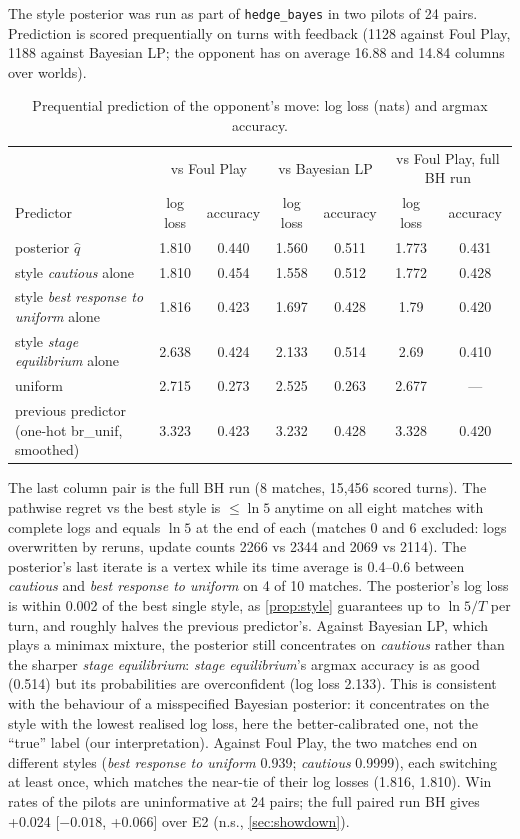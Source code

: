\documentclass[10pt]{article}
\theoremstyle{plain}
\theoremstyle{definition}
\theoremstyle{remark}
\newcommand{\qhat}{\hat q}
\begin{document}
The style posterior was run as part of \texttt{hedge\_bayes} in two pilots of 24 pairs. Prediction is scored
prequentially on turns with feedback (1128 against Foul Play, 1188 against Bayesian LP; the opponent has on average 16.88
and 14.84 columns over worlds).
\begin{table}[!htbp]\centering\small
\caption{Prequential prediction of the opponent's move: log loss (nats) and argmax accuracy.}\label{tab:behav}
\begin{tabular}{@{}lcccccc@{}}\toprule
 & \multicolumn{2}{c}{vs Foul Play} & \multicolumn{2}{c}{vs Bayesian LP} & \multicolumn{2}{c}{vs Foul Play, full BH run} \\
Predictor & log loss & accuracy & log loss & accuracy & log loss & accuracy \\ \midrule
posterior $\qhat$ & 1.810 & 0.440 & 1.560 & 0.511 & 1.773 & 0.431 \\
style \emph{cautious} alone & 1.810 & 0.454 & 1.558 & 0.512 & 1.772 & 0.428 \\
style \emph{best response to uniform} alone & 1.816 & 0.423 & 1.697 & 0.428 & 1.79 & 0.420 \\
style \emph{stage equilibrium} alone & 2.638 & 0.424 & 2.133 & 0.514 & 2.69 & 0.410 \\
uniform & 2.715 & 0.273 & 2.525 & 0.263 & 2.677 & --- \\
previous predictor (one-hot br\_unif, smoothed) & 3.323 & 0.423 & 3.232 & 0.428 & 3.328 & 0.420 \\ \bottomrule
\end{tabular}\end{table}
The last column pair is the full BH run (8 matches, 15,456 scored turns). The pathwise regret vs the best style is
$\le\ln5$ anytime on all eight matches with complete logs and equals $\ln5$ at the end of each (matches 0 and 6 excluded: logs
overwritten by reruns, update counts 2266 vs 2344 and 2069 vs 2114). The posterior's last iterate is a vertex while its
time average is 0.4--0.6 between \emph{cautious} and \emph{best response to uniform} on 4 of 10 matches.
The posterior's log loss is within 0.002 of the best single style, as \cref{prop:style} guarantees up to
$\ln5/T$ per turn, and roughly halves the previous predictor's. Against Bayesian LP, which plays a minimax mixture, the
posterior still concentrates on \emph{cautious} rather than the sharper \emph{stage equilibrium}: \emph{stage equilibrium}'s argmax accuracy is as good
(0.514) but its probabilities are overconfident (log loss 2.133). This is consistent with the behaviour of a misspecified Bayesian posterior: it concentrates on the style with the
lowest realised log loss, here the better-calibrated one, not the ``true'' label (our interpretation). Against Foul Play, the
two matches end on different styles (\emph{best response to uniform} 0.939; \emph{cautious} 0.9999), each switching at least once, which
matches the near-tie of their log losses (1.816, 1.810). Win rates of the
pilots are uninformative at 24 pairs; the full paired run BH gives +0.024 [$-0.018$, +0.066] over E2 (n.s.,
\cref{sec:showdown}).
\end{document}
